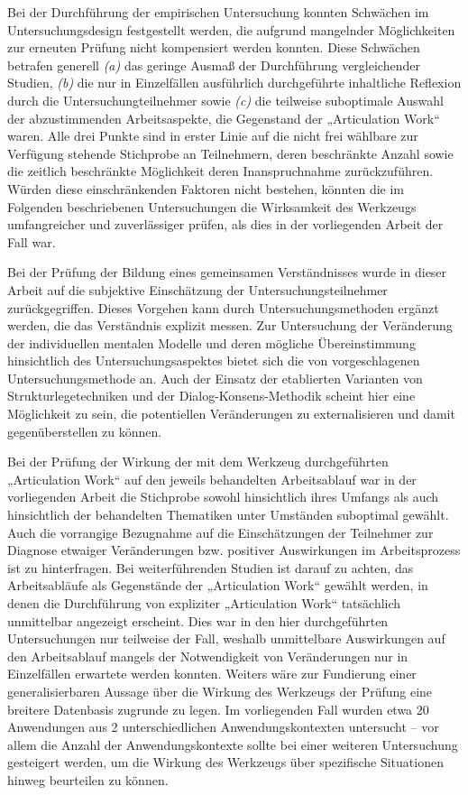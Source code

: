 Bei der Durchführung der empirischen Untersuchung konnten Schwächen im Untersuchungsdesign festgestellt werden, die aufgrund mangelnder Möglichkeiten zur erneuten Prüfung nicht kompensiert werden konnten. Diese Schwächen betrafen generell \emph{(a)} das geringe Ausmaß der Durchführung vergleichender Studien, \emph{(b)} die nur in Einzelfällen ausführlich durchgeführte inhaltliche Reflexion durch die Untersuchungteilnehmer sowie \emph{(c)} die teilweise suboptimale Auswahl der abzustimmenden Arbeitsaspekte, die Gegenstand der „Articulation Work“ waren. Alle drei Punkte sind in erster Linie auf die nicht frei wählbare zur Verfügung stehende Stichprobe an Teilnehmern, deren beschränkte Anzahl sowie die zeitlich beschränkte Möglichkeit deren Inanspruchnahme zurückzuführen. Würden diese einschränkenden Faktoren nicht bestehen, könnten die im Folgenden beschriebenen Untersuchungen die Wirksamkeit des Werkzeugs umfangreicher und zuverlässiger prüfen, als dies in der vorliegenden Arbeit der Fall war.

Bei der Prüfung der Bildung eines gemeinsamen Verständnisses wurde in dieser Arbeit auf die subjektive Einschätzung der Untersuchungsteilnehmer zurückgegriffen. Dieses Vorgehen kann durch Untersuchungsmethoden ergänzt werden, die das Verständnis explizit messen. Zur Untersuchung der Veränderung der individuellen mentalen Modelle und deren mögliche Übereinstimmung hinsichtlich des Untersuchungsaspektes bietet sich die von \citep{Ifenthaler06} vorgeschlagenen Untersuchungsmethode an. Auch der Einsatz der etablierten Varianten von Strukturlegetechniken und der Dialog-Konsens-Methodik scheint hier eine Möglichkeit zu sein, die potentiellen Veränderungen zu externalisieren und damit gegenüberstellen zu können.

Bei der Prüfung der Wirkung der mit dem Werkzeug durchgeführten „Articulation Work“ auf den jeweils behandelten Arbeitsablauf war in der vorliegenden Arbeit die Stichprobe sowohl hinsichtlich ihres Umfangs als auch hinsichtlich der behandelten Thematiken unter Umständen suboptimal gewählt. Auch die vorrangige Bezugnahme auf die Einschätzungen der Teilnehmer zur Diagnose etwaiger Veränderungen bzw. positiver Auswirkungen im Arbeitsprozess ist zu hinterfragen. Bei weiterführenden Studien ist darauf zu achten, das Arbeitsabläufe als Gegenstände der „Articulation Work“ gewählt werden, in denen die Durchführung von expliziter „Articulation Work“ tatsächlich unmittelbar angezeigt erscheint. Dies war in den hier durchgeführten Untersuchungen nur teilweise der Fall, weshalb unmittelbare Auswirkungen auf den Arbeitsablauf mangels der Notwendigkeit von Veränderungen nur in Einzelfällen erwartete werden konnten. Weiters wäre zur Fundierung einer generalisierbaren Aussage über die Wirkung des Werkzeugs der Prüfung eine breitere Datenbasis zugrunde zu legen. Im vorliegenden Fall wurden etwa 20 Anwendungen aus 2 unterschiedlichen Anwendungskontexten untersucht -- vor allem die Anzahl der Anwendungskontexte sollte bei einer weiteren Untersuchung gesteigert werden, um die Wirkung des Werkzeugs über spezifische Situationen hinweg beurteilen zu können.

